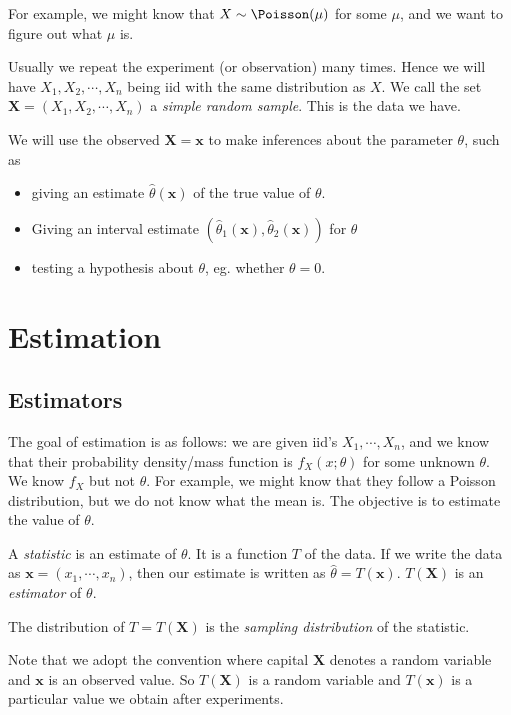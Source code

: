 \documentclass[a4paper]{article}
\begin{document}
For example, we might know that $X\sim \Poisson (\mu)$ for some $\mu$, and we want to figure out what $\mu$ is.

Usually we repeat the experiment (or observation) many times. Hence we will have $X_1, X_2, \cdots, X_n$ being iid with the same distribution as $X$. We call the set $\mathbf{X} = (X_1, X_2, \cdots, X_n)$ a \emph{simple random sample}. This is the data we have.

We will use the observed $\mathbf{X} = \mathbf{x}$ to make inferences about the parameter $\theta$, such as
\begin{itemize}
  \item giving an estimate $\hat{\theta}(\mathbf{x})$ of the true value of $\theta$.
  \item Giving an interval estimate $(\hat{\theta}_1(\mathbf{x}), \hat{\theta}_2(\mathbf{x}))$ for $\theta$
  \item testing a hypothesis about $\theta$, eg. whether $\theta = 0$.
\end{itemize}
\section{Estimation}
\subsection{Estimators}
The goal of estimation is as follows: we are given iid's $X_1, \cdots, X_n$, and we know that their probability density/mass function is $f_X(x; \theta)$ for some unknown $\theta$. We know $f_X$ but not $\theta$. For example, we might know that they follow a Poisson distribution, but we do not know what the mean is. The objective is to estimate the value of $\theta$.

\begin{defi}[Statistic]
  A \emph{statistic} is an estimate of $\theta$. It is a function $T$ of the data. If we write the data as $\mathbf{x} = (x_1, \cdots, x_n)$, then our estimate is written as $\hat{\theta} = T(\mathbf{x})$. $T(\mathbf{X})$ is an \emph{estimator} of $\theta$.

  The distribution of $T = T(\mathbf{X})$ is the \emph{sampling distribution} of the statistic.
\end{defi}
Note that we adopt the convention where capital $\mathbf{X}$ denotes a random variable and $\mathbf{x}$ is an observed value. So $T(\mathbf{X})$ is a random variable and $T(\mathbf{x})$ is a particular value we obtain after experiments.
\end{document}
